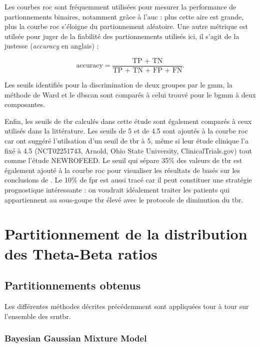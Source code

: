 Les courbes \gls{roc} sont fréquemment utilisées pour mesurer la performance de partionnements binaires, notamment grâce à
l'\gls{auc} : plus cette aire est grande, plus la courbe \gls{roc} s'éloigne du partionnement aléatoire. Une autre métrique est utilsée 
pour juger de la fiabilité des partionnements utilisés ici, il s'agit de la justesse (\textit{accuracy} en anglais) :

\begin{equation}
\label{eq:tbr_accuracy}
\text{accuracy} = \frac{\text{TP + TN}}{\text{TP + TN + FP + FN}}.
\end{equation}

Les seuils identifiés pour la discrimination de deux groupes par le \gls{gmm}, la méthode de Ward et le \gls{dbscan} sont comparés à celui trouvé pour 
le \gls{bgmm} à deux composantes.

Enfin, les seuils de \gls{tbr} calculés dans cette étude sont également comparés à ceux utilisés dans la littérature. Les seuils de 5 et de 4.5 sont
ajoutés à la courbe \gls{roc} car \citet{Kerson2013} ont suggéré l'utilsation d'un seuil de \gls{tbr} à 5, même si leur étude clinique l'a fixé 
à 4.5 (NCT02251743, Arnold, Ohio State University, ClinicalTrials.gov) tout comme l'étude NEWROFEED. Le seuil qui sépare 35\% des valeurs de 
\gls{tbr} est également ajouté à la courbe \gls{roc} pour visualiser les résultats de \citet{Zhang2017} basés sur les conclusions de \citet{Clarke2011}.
Le 10\% de \gls{fpr} est aussi tracé car il peut constituer une stratégie prognostique intéressante : on voudrait idéalement traiter les patients qui 
appartiennent au sous-goupe \gls{tbr} élevé avec le protocole de diminution du \gls{tbr}.

\section{Partitionnement de la distribution des Theta-Beta ratios}

\subsection{Partitionnements obtenus}

Les différentes méthodes décrites précédemment sont appliquées tour à tour sur l'ensemble des \gls{srntbr}.

\subsubsection{Bayesian Gaussian Mixture Model}

